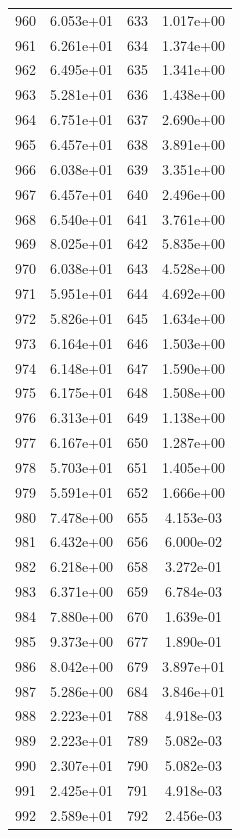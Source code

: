 \documentclass[12pt]{article}
\begin{document}
\begin{longtable}{@{}cccc@{}}
960 & 6.053e+01 & 633 & 1.017e+00 \\
961 & 6.261e+01 & 634 & 1.374e+00 \\
962 & 6.495e+01 & 635 & 1.341e+00 \\
963 & 5.281e+01 & 636 & 1.438e+00 \\
964 & 6.751e+01 & 637 & 2.690e+00 \\
965 & 6.457e+01 & 638 & 3.891e+00 \\
966 & 6.038e+01 & 639 & 3.351e+00 \\
967 & 6.457e+01 & 640 & 2.496e+00 \\
968 & 6.540e+01 & 641 & 3.761e+00 \\
969 & 8.025e+01 & 642 & 5.835e+00 \\
970 & 6.038e+01 & 643 & 4.528e+00 \\
971 & 5.951e+01 & 644 & 4.692e+00 \\
972 & 5.826e+01 & 645 & 1.634e+00 \\
973 & 6.164e+01 & 646 & 1.503e+00 \\
974 & 6.148e+01 & 647 & 1.590e+00 \\
975 & 6.175e+01 & 648 & 1.508e+00 \\
976 & 6.313e+01 & 649 & 1.138e+00 \\
977 & 6.167e+01 & 650 & 1.287e+00 \\
978 & 5.703e+01 & 651 & 1.405e+00 \\
979 & 5.591e+01 & 652 & 1.666e+00 \\
980 & 7.478e+00 & 655 & 4.153e-03 \\
981 & 6.432e+00 & 656 & 6.000e-02 \\
982 & 6.218e+00 & 658 & 3.272e-01 \\
983 & 6.371e+00 & 659 & 6.784e-03 \\
984 & 7.880e+00 & 670 & 1.639e-01 \\
985 & 9.373e+00 & 677 & 1.890e-01 \\
986 & 8.042e+00 & 679 & 3.897e+01 \\
987 & 5.286e+00 & 684 & 3.846e+01 \\
988 & 2.223e+01 & 788 & 4.918e-03 \\
989 & 2.223e+01 & 789 & 5.082e-03 \\
990 & 2.307e+01 & 790 & 5.082e-03 \\
991 & 2.425e+01 & 791 & 4.918e-03 \\
992 & 2.589e+01 & 792 & 2.456e-03 \\

\bottomrule
\end{longtable}
\end{document}
